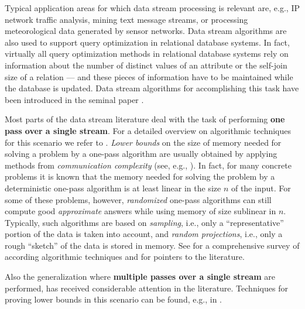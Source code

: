 \documentclass[proceedings]{stacs}
\theoremstyle{plain}\newtheorem{satz}[thm]{Satz}
\theoremstyle{definition}\newtheorem{crucial}[thm]{Crucial Definition}
\begin{document}
Typical application areas for which
data stream processing is relevant are, e.g., 
IP network traffic analysis, mining text message streams, or processing
meteorological data generated by sensor networks.
Data stream algorithms are also used to support query optimization
in relational database systems.
In fact, virtually all query optimization methods in 
relational database systems rely on information about
the number of distinct values of an attribute or the self-join size of a relation 
--- and these pieces of information have to be maintained while the database is updated. 
Data stream algorithms for accomplishing this task have been introduced in the seminal
paper \cite{alomatsze99}.



Most parts of the data stream literature deal with the task of performing
\textbf{one pass over a single stream}. For a detailed overview
on algorithmic techniques for this scenario we refer to \cite{Muthukrishnan-DataStream-Algos}.
 \emph{Lower bounds} on the size of  memory needed for solving a problem by a 
one-pass algorithm are usually obtained by applying methods from 
\emph{communication complexity} 
(see, e.g., \cite{alomatsze99,henragraj99}).
In fact, for many concrete problems it is known that the memory needed 
for solving the problem by a deterministic one-pass algorithm is at 
least linear in the size $n$ of the input.
For some of these problems, however,
\emph{randomized} one-pass algorithms can still compute good \emph{approximate} answers 
while using memory of size sublinear in $n$.
Typically, such algorithms are based on \emph{sampling}, 
i.e., only a ``representative'' portion of the data is taken into account, 
and \emph{random projections}, i.e., only a rough ``sketch'' of the data is stored in memory.
See \cite{Muthukrishnan-DataStream-Algos,ChristianSohler-Survey} for a comprehensive survey 
of according algorithmic techniques and for pointers to the literature.

Also the generalization where \textbf{multiple passes over a single stream} are performed, 
has received considerable attention in the literature. 
Techniques for proving lower bounds in this scenario can be found, 
e.g., in 
\cite{henragraj99,GuhaMcGregor-ICALP08,DBLP:journals/dcg/ChanC07,DBLP:conf/focs/GalG07,munpat80}.
\end{document}

